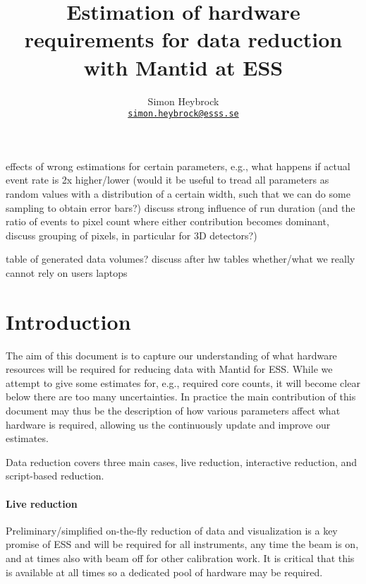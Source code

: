 \documentclass[a4paper,english,numbers=noenddot,bibliography=totoc,chapterprefix=on,DIV=12]{scrartcl}
\newcommand{\mantid}{Mantid\xspace}
\begin{document}
\title{Estimation of hardware requirements for data reduction with \mantid at ESS}
\author{Simon Heybrock\\
    {\small\href{mailto:simon.heybrock@esss.se}{\nolinkurl{simon.heybrock@esss.se}}}}

\maketitle

\tableofcontents

effects of wrong estimations for certain parameters, e.g., what happens if actual event rate is 2x higher/lower (would it be useful to tread all parameters as random values with a distribution of a certain width, such that we can do some sampling to obtain error bars?)
discuss strong influence of run duration (and the ratio of events to pixel count where either contribution becomes dominant, discuss grouping of pixels, in particular for 3D detectors?)

table of generated data volumes?
discuss after hw tables whether/what we really cannot rely on users laptops

\section{Introduction}

The aim of this document is to capture our understanding of what hardware resources will be required for reducing data with \mantid for ESS.
While we attempt to give some estimates for, e.g., required core counts, it will become clear below there are too many uncertainties. In practice the main contribution of this document may thus be the description of how various parameters affect what hardware is required, allowing us the continuously update and improve our estimates.

Data reduction covers three main cases, live reduction, interactive reduction, and script-based reduction.

\paragraph{Live reduction}
Preliminary/simplified on-the-fly reduction of data and visualization is a key promise of ESS and will be required for all instruments, any time the beam is on, and at times also with beam off for other calibration work.
It is critical that this is available at all times so a dedicated pool of hardware may be required.
\end{document}
